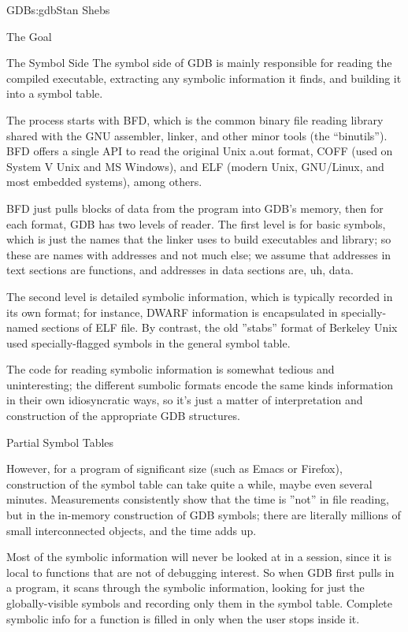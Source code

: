 \begin{aosachapter}{GDB}{s:gdb}{Stan Shebs}
\begin{aosasect1}{The Goal}
\begin{aosasect1}{The Symbol Side}
The symbol side of GDB is mainly responsible for reading the compiled
executable, extracting any symbolic information it finds, and building
it into a symbol table.

The process starts with BFD, which is the common binary file reading
library shared with the GNU assembler, linker, and other minor tools
(the ``binutils'').  BFD offers a single API to read the original Unix
a.out format, COFF (used on System V Unix and MS Windows), and ELF
(modern Unix, GNU/Linux, and most embedded systems), among others.

BFD just pulls blocks of data from the program into GDB's memory, then
for each format, GDB has two levels of reader.  The first level is for
basic symbols, which is just the names that the linker uses to build
executables and library; so these are names with addresses and not
much else; we assume that addresses in text sections are functions,
and addresses in data sections are, uh, data.

The second level is detailed symbolic information, which is typically
recorded in its own format; for instance, DWARF information is
encapsulated in specially-named sections of ELF file.  By contrast,
the old ''stabs'' format of Berkeley Unix used specially-flagged
symbols in the general symbol table.

The code for reading symbolic information is somewhat tedious and
uninteresting; the different sumbolic formats encode the same kinds
information in their own idiosyncratic ways, so it's just a matter of
interpretation and construction of the appropriate GDB structures.

\end{aosasect1}

\begin{aosasect1}{Partial Symbol Tables}

However, for a program of significant size (such as Emacs or Firefox),
construction of the symbol table can take quite a while, maybe even
several minutes.  Measurements consistently show that the time is
''not'' in file reading, but in the in-memory construction of GDB
symbols; there are literally millions of small interconnected objects,
and the time adds up.

Most of the symbolic information will never be looked at in a session,
since it is local to functions that are not of debugging interest.  So
when GDB first pulls in a program, it scans through the symbolic
information, looking for just the globally-visible symbols and
recording only them in the symbol table.  Complete symbolic info for a
function is filled in only when the user stops inside it.


\end{aosasect1}
\end{aosasect1}
\end{aosachapter}
